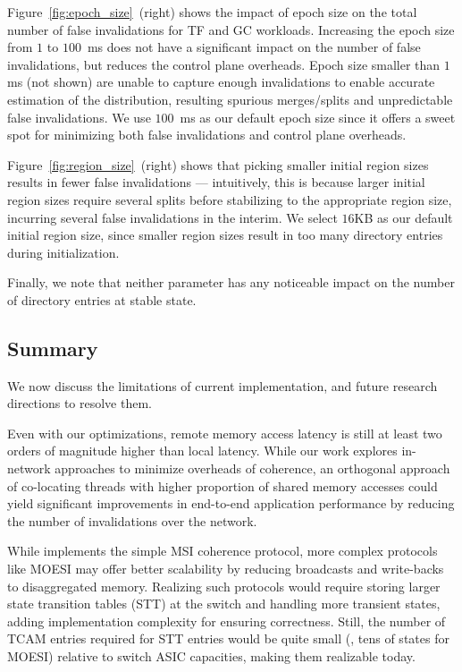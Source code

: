  Figure~\ref{fig:epoch_size}~(right) shows the impact of epoch size on the total number of false invalidations for TF and GC workloads. Increasing the epoch size from $1$ to $100$~ms does not have a significant impact on the number of false invalidations, but reduces the control plane overheads. Epoch size smaller than $1$ms (not shown) are unable to capture enough invalidations to enable accurate estimation of the distribution, resulting spurious merges/splits and unpredictable false invalidations. We use $100$~ms as our default epoch size since it offers a sweet spot for minimizing both false invalidations and control plane overheads.

Figure~\ref{fig:region_size}~(right) shows that picking smaller initial region sizes results in fewer false invalidations --- intuitively, this is because larger initial region sizes require several splits before stabilizing to the appropriate region size, incurring several false invalidations in the interim. We select $16$KB as our default initial region size, since smaller region sizes result in too many directory entries during initialization. 

Finally, we note that neither parameter has any noticeable impact on the number of directory entries at stable state.

\subsection{Summary}

We now discuss the limitations of current \mind implementation, and future research directions to resolve them. 

 Even with our optimizations, remote memory access latency is still at least two orders of magnitude higher than local latency. While our work explores in-network approaches to minimize overheads of coherence, an orthogonal approach of co-locating threads with higher proportion of shared memory accesses could yield significant improvements in end-to-end application performance by reducing the number of invalidations over the network.

 While \mind implements the simple MSI coherence protocol, more complex protocols like MOESI may offer better scalability by reducing broadcasts and write-backs to disaggregated memory. Realizing such protocols would require storing larger state transition tables (STT) at the switch and handling more transient states, adding implementation complexity for ensuring correctness. Still, the number of TCAM entries required for STT entries would be quite small (\eg, tens of states for MOESI) relative to switch ASIC capacities, making them realizable today.

